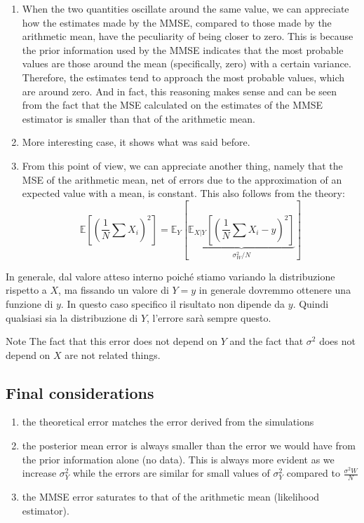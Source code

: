 \begin{enumerate}
    \item When the two quantities oscillate around the same value, we can appreciate how the estimates made by the MMSE, compared to those made by the arithmetic mean, have the peculiarity of being closer to zero. This is because the prior information used by the MMSE indicates that the most probable values are those around the mean (specifically, zero) with a certain variance. Therefore, the estimates tend to approach the most probable values, which are around zero. And in fact, this reasoning makes sense and can be seen from the fact that the MSE calculated on the estimates of the MMSE estimator is smaller than that of the arithmetic mean.
    \item More interesting case, it shows what was said before.
    \item From this point of view, we can appreciate another thing, namely that the MSE of the arithmetic mean, net of errors due to the approximation of an expected value with a mean, is constant. This also follows from the theory:
          $$
              \mathbb E\left[\left(\frac 1N\sum X_i\right)^2\right]=\mathbb E_Y\left[\underbrace{\mathbb E_{X|Y}\left[\left(\frac 1N\sum X_i-y\right)^2\right]}_{\sigma_W^2/N}\right]
          $$
\end{enumerate}

In generale, dal valore atteso interno poiché stiamo variando la distribuzione rispetto a $X$, ma fissando un valore di $Y=y$ in generale dovremmo ottenere una funzione di $y$. In questo caso specifico il risultato non dipende da $y$. Quindi qualsiasi sia la distribuzione di $Y$, l'errore sarà sempre questo.

\begin{note}{Note}
    The fact that this error does not depend on $Y$ and the fact that $\sigma^2$ does not depend on $X$ are not related things.
\end{note}


\subsection*{Final considerations}

\begin{enumerate}
    \item the theoretical error matches the error derived from the simulations
    \item the posterior mean error is always smaller than the error we would have from the prior information alone (no data). This is always more evident as we increase $\sigma^2_Y$ while the errors are similar for small values of $\sigma^2_Y$ compared to $\frac{\sigma^2 W}{N}$
    \item the MMSE error saturates to that of the arithmetic mean (likelihood estimator).
\end{enumerate}



